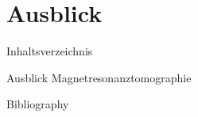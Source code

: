 \documentclass[t,9pt]{beamer}
\begin{document}
        \section{Ausblick}

        \begin{frame}{Inhaltsverzeichnis}
                \tableofcontents[currentsection]
        \end{frame}

        \begin{frame}{Ausblick}
                \pause
                Magnetresonanztomographie        
        \end{frame}

        \begin{frame}{Bibliography}
                \tiny
                
                
        \end{frame}
                
\end{document}
